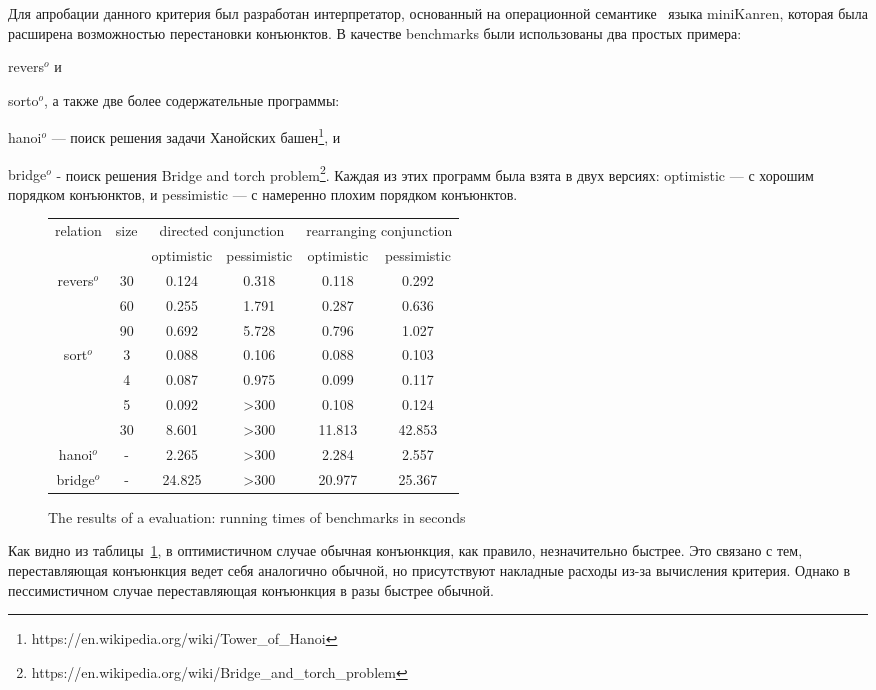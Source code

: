 \documentclass[submission,copyright,creativecommons]{eptcs}
\newcommand*{\SavedLstInline}{}
\DeclareRobustCommand*{\lstinline}{%
  \ifmmode
    \let\SavedBGroup\bgroup
    \def\bgroup{%
      \let\bgroup\SavedBGroup
      \hbox\bgroup
    }%
  \fi
  \SavedLstInline
}
\begin{document}
Для апробации данного критерия был разработан интерпретатор, основанный на операционной семантике~\cite{CertifiedSemantics} языка miniKanren, которая была расширена возможностью перестановки конъюнктов.
В качестве benchmarks были использованы два простых примера: \lstinline{revers$^o$} и \lstinline{sorto$^o$}, а также две более содержательные программы: \lstinline{hanoi$^o$} --- поиск решения задачи Ханойских башен\footnote{https://en.wikipedia.org/wiki/Tower_of_Hanoi}, и \lstinline{bridge$^o$} - поиск решения Bridge and torch problem\footnote{https://en.wikipedia.org/wiki/Bridge_and_torch_problem}. Каждая из этих программ была взята в двух версиях: optimistic --- с хорошим порядком конъюнктов, и pessimistic --- с намеренно плохим порядком конъюнктов.

\begin{figure}[h]
  \small
  \centering
  \begin{tabular}{ c | c | c | c | c | c }
    relation & size &  \multicolumn{2}{c}{directed conjunction} & \multicolumn{2}{c}{rearranging conjunction} \\
    \cline{3-6}
    & & optimistic & pessimistic & optimistic & pessimistic  \\
    \hline
    revers$^o$   & 30         & 0.124 & 0.318 & 0.118 & 0.292 \\
                 & 60         & 0.255 & 1.791 & 0.287 & 0.636 \\
                 & 90         & 0.692 & 5.728 & 0.796 & 1.027 \\
    \hline
    sort$^o$     & 3          & 0.088 & 0.106 & 0.088  & 0.103  \\
                 & 4          & 0.087 & 0.975 & 0.099  & 0.117  \\
                 & 5          & 0.092 & >300  & 0.108  & 0.124  \\
                 & 30         & 8.601 & >300  & 11.813 & 42.853 \\
    \hline
    hanoi$^o$    & -          & 2.265 & >300  & 2.284 & 2.557  \\
    \hline
    bridge$^o$   & -          & 24.825 & >300 & 20.977 & 25.367

  \end{tabular}
  \caption{The results of a evaluation: running times of benchmarks in seconds}
  \label{evaluation_results}
\end{figure}

Как видно из таблицы~\ref{evaluation_results}, в оптимистичном случае обычная конъюнкция, как правило, незначительно быстрее. Это связано с тем, переставляющая конъюнкция ведет себя аналогично обычной, но присутствуют накладные расходы из-за вычисления критерия. Однако в пессимистичном случае переставляющая конъюнкция в разы быстрее обычной.



\end{document}

